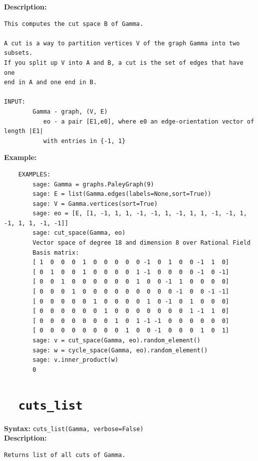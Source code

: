 \documentclass{article}
\begin{document}
\textbf{Description:}
\begin{verbatim}
This computes the cut space B of Gamma. 

A cut is a way to partition vertices V of the graph Gamma into two subsets.
If you split up V into A and B, a cut is the set of edges that have one 
end in A and one end in B.

INPUT:
        Gamma - graph, (V, E)
           eo - a pair [E1,e0], where e0 an edge-orientation vector of length |E1|
           with entries in {-1, 1}

\end{verbatim}

\textbf{Example:}
\begin{verbatim}
    EXAMPLES:
        sage: Gamma = graphs.PaleyGraph(9)
        sage: E = list(Gamma.edges(labels=None,sort=True))
        sage: V = Gamma.vertices(sort=True)
        sage: eo = [E, [1, -1, 1, 1, -1, -1, 1, -1, 1, 1, -1, -1, 1, -1, 1, 1, -1, -1]]
        sage: cut_space(Gamma, eo)
        Vector space of degree 18 and dimension 8 over Rational Field
        Basis matrix:
        [ 1  0  0  0  1  0  0  0  0  0 -1  0  1  0  0 -1  1  0]
        [ 0  1  0  0  1  0  0  0  0  1 -1  0  0  0  0 -1  0 -1]
        [ 0  0  1  0  0  0  0  0  0  1  0  0 -1  1  0  0  0  0]
        [ 0  0  0  1  0  0  0  0  0  0  0  0  0 -1  0  0 -1 -1]
        [ 0  0  0  0  0  1  0  0  0  0  1  0 -1  0  1  0  0  0]
        [ 0  0  0  0  0  0  1  0  0  0  0  0  0  0  1 -1  1  0]
        [ 0  0  0  0  0  0  0  1  0  1 -1 -1  0  0  0  0  0  0]
        [ 0  0  0  0  0  0  0  0  1  0  0 -1  0  0  0  1  0  1]
        sage: v = cut_space(Gamma, eo).random_element()
        sage: w = cycle_space(Gamma, eo).random_element()
        sage: v.inner_product(w)
        0
\end{verbatim}

\section{\tt \ \ cuts\_list}

\textbf{Syntax:} \verb}cuts_list(Gamma, verbose=False)}\\

\textbf{Description:}
\begin{verbatim}
Returns list of all cuts of Gamma.
\end{verbatim}
\end{document}
